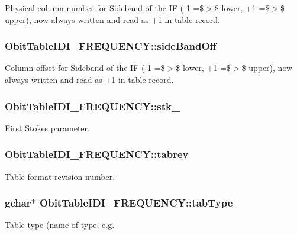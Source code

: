 Physical column number for Sideband of the IF (-1 =\$$>$\$ lower, +1 =\$$>$\$ upper), now always written and read as +1 in table record. 

\subsubsection{ {\bf Obit\-Table\-IDI\_\-FREQUENCY::side\-Band\-Off}}\label{structObitTableIDI__FREQUENCY_o34}


Column offset for Sideband of the IF (-1 =\$$>$\$ lower, +1 =\$$>$\$ upper), now always written and read as +1 in table record. 

\subsubsection{ {\bf Obit\-Table\-IDI\_\-FREQUENCY::stk\_}}\label{structObitTableIDI__FREQUENCY_o17}


First Stokes parameter. 

\subsubsection{ {\bf Obit\-Table\-IDI\_\-FREQUENCY::tabrev}}\label{structObitTableIDI__FREQUENCY_o15}


Table format revision number. 

\subsubsection{\setlength{\rightskip}{0pt plus 5cm}gchar$\ast$ {\bf Obit\-Table\-IDI\_\-FREQUENCY::tab\-Type}}\label{structObitTableIDI__FREQUENCY_o12}


Table type (name of type, e.g. 

